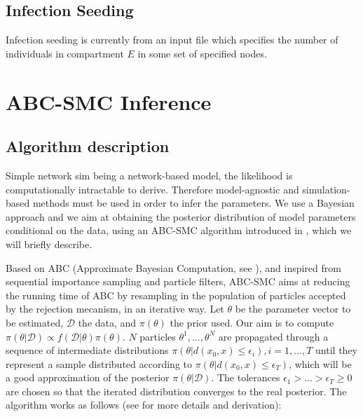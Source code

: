 \documentclass[11pt]{article}
\begin{document}
\subsection{Infection Seeding}
Infection seeding is currently from an input file which specifies the number of individuals in compartment $E$ in some set of specified nodes.  

\section{ABC-SMC Inference}

\subsection{Algorithm description}

Simple network sim being a network-based model, the likelihood is computationally intractable to derive. Therefore model-agnostic and simulation-based methods must be used in order to infer the parameters.  We use a Bayesian approach and we aim at obtaining the posterior distribution of model parameters conditional on the data, using an ABC-SMC algorithm introduced in \cite{ABCSMC}, which we will briefly describe.

Based on ABC (Approximate Bayesian Computation, see \cite{ABC}), and inspired from sequential importance sampling and particle filters, ABC-SMC aims at reducing the running time of ABC by resampling in the population of particles accepted by the rejection mecanism, in an iterative way. Let $\theta$ be the parameter vector to be estimated, $\mathcal{D}$ the data, and $\pi(\theta)$ the prior used. Our aim is to compute $\pi(\theta|\mathcal{D}) \propto f(\mathcal{D}|\theta)\pi(\theta)$. $N$ particles $\theta^{1}, ..., \theta^{N}$ are propagated through a sequence of intermediate distributions $\pi(\theta|d(x_0, x)\leq\epsilon_i), i=1,...,T$ until they represent a sample distributed according to $\pi(\theta|d(x_0, x)\leq\epsilon_T)$, which will be a good approximation of the posterior $\pi(\theta|\mathcal{D})$. The tolerances $\epsilon_1 > ... > \epsilon_T \geq 0$ are chosen so that the iterated distribution converges to the real posterior. The algorithm works as follows (see \cite{ABCSMC} for more details and derivation):
\end{document}
